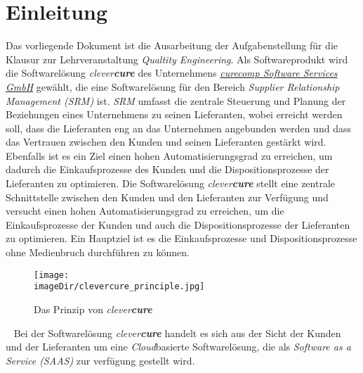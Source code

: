 \section{Einleitung}
\label{sec:einleitung}
Das vorliegende Dokument ist die Ausarbeitung der Aufgabenstellung für die Klausur zur Lehrveranstaltung \emph{Qualtity Engineering}. Als Softwareprodukt wird die Softwarelösung \emph{clever\textbf{cure}} des Unternehmens \hyperlink{http://www.curecomp.com/}{\emph{curecomp Software Services GmbH}} gewählt, die eine Softwarelösung für den Bereich \emph{Supplier Relationship Management (SRM)} ist. 
\newline
\newline
\emph{SRM} umfasst die zentrale Steuerung und Planung der Beziehungen eines Unternehmens zu seinen Lieferanten, wobei erreicht werden soll, dass die Lieferanten eng an das Unternehmen angebunden werden und dass das Vertrauen zwischen den Kunden und seinen Lieferanten gestärkt wird. Ebenfalls ist es ein Ziel einen hohen Automatisierungsgrad zu erreichen, um dadurch die Einkaufsprozesse des Kunden und die Dispositionsprozesse der Lieferanten zu optimieren.  
\newline
\newline
Die Softwarelösung \emph{clever\textbf{cure}} stellt eine zentrale Schnittstelle zwischen den Kunden und den Lieferanten zur Verfügung und versucht einen hohen Automatisierungsgrad zu erreichen, um die Einkaufsprozesse der Kunden und auch die Dispositionsprozesse der Lieferanten zu optimieren. Ein Hauptziel ist es die Einkaufsprozesse und Dispositionsprozesse ohne Medienbruch durchführen zu können.

\begin{figure}[h]
	\centering
	\texttt{[image: \\imageDir/clevercure\_principle.jpg]}
	\caption{Das Prinzip von \emph{clever\textbf{cure}}}
	\label{fig:clevercure-principle}
\end{figure}
\ \newline
Bei der Softwarelösung \emph{clever\textbf{cure}} handelt es sich aus der Sicht der Kunden und der Lieferanten um eine \emph{Cloud}basierte Softwarelösung, die als \emph{Software as a Service (SAAS)} zur verfügung gestellt wird.
\newpage

